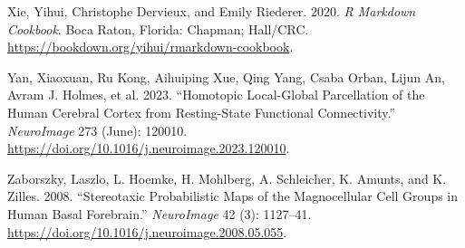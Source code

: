 \documentclass[
  table]{article}
\newlength{\cslhangindent}
\newenvironment{CSLReferences}[2] %
 {\begin{list}{}{%
  \setlength{\itemindent}{0pt}
  \setlength{\leftmargin}{0pt}
  \setlength{\parsep}{0pt}
  \ifodd #1
   \setlength{\leftmargin}{\cslhangindent}
   \setlength{\itemindent}{-1\cslhangindent}
  \fi
  \setlength{\itemsep}{#2\baselineskip}}}
 {\end{list}}
\begin{document}
\begin{CSLReferences}{1}{0}
Xie, Yihui, Christophe Dervieux, and Emily Riederer. 2020. \emph{R
Markdown Cookbook}. Boca Raton, Florida: Chapman; Hall/CRC.
\url{https://bookdown.org/yihui/rmarkdown-cookbook}.

Yan, Xiaoxuan, Ru Kong, Aihuiping Xue, Qing Yang, Csaba Orban, Lijun An,
Avram J. Holmes, et al. 2023. {``Homotopic Local-Global Parcellation of
the Human Cerebral Cortex from Resting-State Functional Connectivity.''}
\emph{NeuroImage} 273 (June): 120010.
\url{https://doi.org/10.1016/j.neuroimage.2023.120010}.

Zaborszky, Laszlo, L. Hoemke, H. Mohlberg, A. Schleicher, K. Amunts, and
K. Zilles. 2008. {``Stereotaxic Probabilistic Maps of the Magnocellular
Cell Groups in Human Basal Forebrain.''} \emph{NeuroImage} 42 (3):
1127--41. \url{https://doi.org/10.1016/j.neuroimage.2008.05.055}.

\end{CSLReferences}
\end{document}
